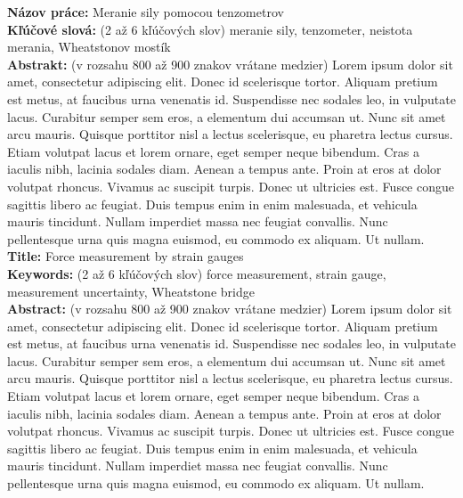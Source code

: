 \noindent
\textbf{Názov práce:} Meranie sily pomocou tenzometrov\\
\textbf{Kľúčové slová: } (2 až 6 kľúčových slov) meranie sily, tenzometer, neistota merania, Wheatstonov mostík\\
\textbf{Abstrakt: } (v rozsahu 800 až 900 znakov vrátane medzier) Lorem ipsum dolor sit amet, consectetur adipiscing elit. Donec id scelerisque tortor. Aliquam pretium est metus, at faucibus urna venenatis id. Suspendisse nec sodales leo, in vulputate lacus. Curabitur semper sem eros, a elementum dui accumsan ut. Nunc sit amet arcu mauris. Quisque porttitor nisl a lectus scelerisque, eu pharetra lectus cursus. Etiam volutpat lacus et lorem ornare, eget semper neque bibendum. Cras a iaculis nibh, lacinia sodales diam. Aenean a tempus ante. Proin at eros at dolor volutpat rhoncus. Vivamus ac suscipit turpis. Donec ut ultricies est. Fusce congue sagittis libero ac feugiat. Duis tempus enim in enim malesuada, et vehicula mauris tincidunt. Nullam imperdiet massa nec feugiat convallis. Nunc pellentesque urna quis magna euismod, eu commodo ex aliquam. Ut nullam.\\

\noindent
\textbf{Title:} Force measurement by strain gauges\\
\textbf{Keywords: } (2 až 6 kľúčových slov) force measurement, strain gauge, measurement uncertainty, Wheatstone bridge\\
\textbf{Abstract: } (v rozsahu 800 až 900 znakov vrátane medzier) Lorem ipsum dolor sit amet, consectetur adipiscing elit. Donec id scelerisque tortor. Aliquam pretium est metus, at faucibus urna venenatis id. Suspendisse nec sodales leo, in vulputate lacus. Curabitur semper sem eros, a elementum dui accumsan ut. Nunc sit amet arcu mauris. Quisque porttitor nisl a lectus scelerisque, eu pharetra lectus cursus. Etiam volutpat lacus et lorem ornare, eget semper neque bibendum. Cras a iaculis nibh, lacinia sodales diam. Aenean a tempus ante. Proin at eros at dolor volutpat rhoncus. Vivamus ac suscipit turpis. Donec ut ultricies est. Fusce congue sagittis libero ac feugiat. Duis tempus enim in enim malesuada, et vehicula mauris tincidunt. Nullam imperdiet massa nec feugiat convallis. Nunc pellentesque urna quis magna euismod, eu commodo ex aliquam. Ut  nullam.
\cleardoublepage